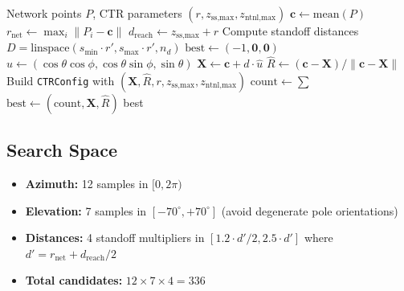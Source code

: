 \documentclass[11pt,a4paper]{article}
\begin{document}
\begin{algorithm}[H]
\caption{Spherical Shell Placement Optimization}
\begin{algorithmic}[1]
\Require Network points $P$, CTR parameters $(r, z_\text{ss,max}, z_\text{ntnl,max})$
\State $\mathbf{c} \gets \text{mean}(P)$ 
\State $r_\text{net} \gets \max_i \|P_i - \mathbf{c}\|$ 
\State $d_\text{reach} \gets z_\text{ss,max} + r$ 
\State Compute standoff distances $D = \text{linspace}(s_\text{min} \cdot r', s_\text{max} \cdot r', n_d)$
\State $\text{best} \gets (-1, \mathbf{0}, \mathbf{0})$ 
        \ForAll{$\phi \in [0, 360^\circ)$ sampled at $n_\text{az}$ points}
            \State $\hat{u} \gets (\cos\theta\cos\phi, \cos\theta\sin\phi, \sin\theta)$
            \State $\mathbf{X} \gets \mathbf{c} + d \cdot \hat{u}$
            \State $\hat{R} \gets (\mathbf{c} - \mathbf{X}) / \|\mathbf{c} - \mathbf{X}\|$ 
            \State Build \texttt{CTRConfig} with $(\mathbf{X}, \hat{R}, r, z_\text{ss,max}, z_\text{ntnl,max})$
            \State $\text{count} \gets \sum$ 
                \State $\text{best} \gets (\text{count}, \mathbf{X}, \hat{R})$
            \EndIf
        \EndFor
    \EndFor
\EndFor
\State \Return best
\end{algorithmic}
\end{algorithm}

\subsection{Search Space}

\begin{itemize}[nosep]
    \item \textbf{Azimuth:} 12 samples in $[0, 2\pi)$
    \item \textbf{Elevation:} 7 samples in $[-70^\circ, +70^\circ]$ (avoid degenerate pole orientations)
    \item \textbf{Distances:} 4 standoff multipliers in $[1.2 \cdot d'/2, 2.5 \cdot d']$ where $d' = r_\text{net} + d_\text{reach}/2$
    \item \textbf{Total candidates:} $12 \times 7 \times 4 = 336$
\end{itemize}
\end{document}
